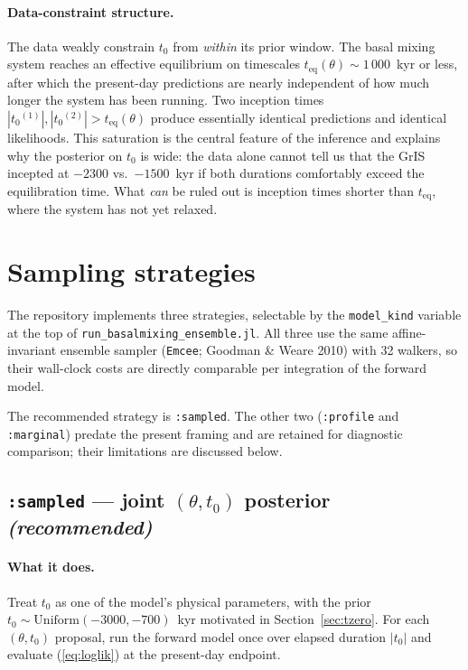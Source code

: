 \documentclass[11pt,a4paper]{article}
\newcommand{\tzero}{\ensuremath{t_{0}}}
\newcommand{\teq}{\ensuremath{t_{\mathrm{eq}}}}
\newcommand{\code}[1]{\texttt{#1}}
\begin{document}
\paragraph{Data-constraint structure.}
The data weakly constrain \tzero{} from \emph{within} its prior window. The
basal mixing system reaches an effective equilibrium on timescales
$\teq(\theta)\sim 1\,000$~kyr or less, after which the present-day
predictions are nearly independent of how much longer the system has been
running. Two inception times $|\tzero^{(1)}|, |\tzero^{(2)}| > \teq(\theta)$
produce essentially identical predictions and identical likelihoods. This
saturation is the central feature of the inference and explains why the
posterior on \tzero{} is wide: the data alone cannot tell us that the GrIS
incepted at $-2300$ vs.\ $-1500$~kyr if both durations comfortably exceed
the equilibration time. What \emph{can} be ruled out is inception times
shorter than $\teq$, where the system has not yet relaxed.

\section{Sampling strategies}
\label{sec:strategies}

The repository implements three strategies, selectable by the
\code{model\_kind} variable at the top of
\code{run\_basalmixing\_ensemble.jl}. All three use the same affine-invariant
ensemble sampler (\code{Emcee}; Goodman \& Weare 2010) with 32 walkers, so
their wall-clock costs are directly comparable per integration of the forward
model.

The recommended strategy is \code{:sampled}. The other two
(\code{:profile} and \code{:marginal}) predate the present framing and are
retained for diagnostic comparison; their limitations are discussed below.

\subsection{\code{:sampled} --- joint $(\theta, \tzero)$ posterior \emph{(recommended)}}

\paragraph{What it does.}
Treat \tzero{} as one of the model's physical parameters, with the prior
$\tzero \sim \mathrm{Uniform}(-3000, -700)$~kyr motivated in
Section~\ref{sec:tzero}. For each $(\theta, \tzero)$ proposal, run the
forward model once over elapsed duration $|\tzero|$ and evaluate
(\ref{eq:loglik}) at the present-day endpoint.
\end{document}
